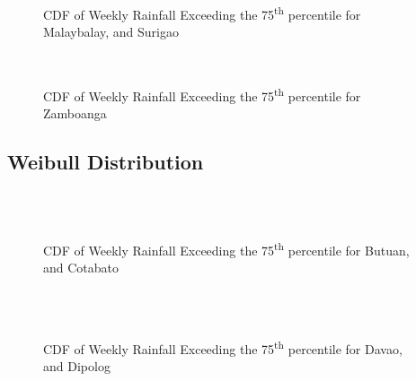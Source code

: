 \begin{figure}[H]
  \centering
  \\
  \\
\caption{CDF of Weekly Rainfall Exceeding the 75\textsuperscript{th} percentile for Malaybalay, and Surigao}
  \label{fig:weekly_0.75_appendix_gd_pt5}
\end{figure}

\begin{figure}[H]
  \centering
  \\
  \caption{CDF of Weekly Rainfall Exceeding the 75\textsuperscript{th} percentile for Zamboanga}
  \label{fig:weekly_0.75_appendix_gd_pt6}
\end{figure}

\subsection{Weibull Distribution}

\begin{figure}[H]
  \centering
  \\
  \\
  \caption{CDF of Weekly Rainfall Exceeding the 75\textsuperscript{th} percentile for Butuan, and Cotabato}
  \label{fig:weekly_0.75_appendix_wb_pt1}
\end{figure}

\begin{figure}[H]
  \centering
  \\
  \\
  \caption{CDF of Weekly Rainfall Exceeding the 75\textsuperscript{th} percentile for Davao, and Dipolog}
  \label{fig:weekly_0.75_appendix_wb_pt2}
\end{figure}

